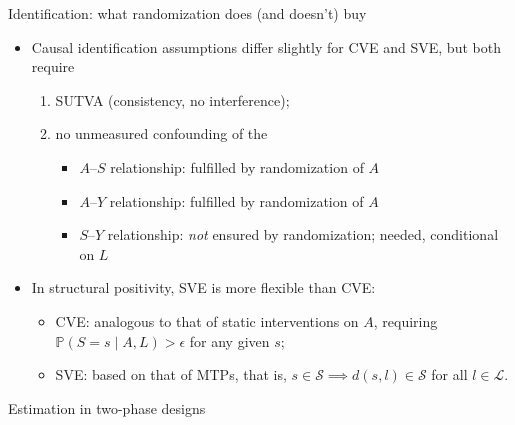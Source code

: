 \documentclass{beamer}
\begin{document}
\begin{frame}[c]{Identification: what randomization does (and doesn't) buy}

\begin{itemize}
  \itemsep6pt
  \item Causal identification assumptions differ slightly for CVE and SVE, but
    both require
    \begin{enumerate}
      \itemsep2pt
      \item SUTVA (consistency, no interference);
      \item no unmeasured confounding of the
        \begin{itemize}
          \itemsep0pt
          \item $A$--$S$ relationship: fulfilled by randomization of $A$
            \checkmark
          \item $A$--$Y$ relationship: fulfilled by randomization of $A$
            \checkmark
          \item \alert{$S$--$Y$ relationship: \textit{not} ensured by
            randomization; needed, conditional on $L$}
        \end{itemize}
    \end{enumerate}
  \item In structural positivity, SVE is more flexible than CVE:
    \begin{itemize}
      \itemsep0pt
      \item CVE: analogous to that of static interventions on $A$, requiring
        $\mathbb{P}(S = s \mid A, L) > \epsilon$ for any given $s$;
      \item SVE: based on that of MTPs, that is, $s \in \mathcal{S} \implies
        d(s, l) \in \mathcal{S}$ for all $l \in \mathcal{L}$.
    \end{itemize}
\end{itemize}


\end{frame}


\begin{frame}[standout]
  Estimation in two-phase designs
\end{frame}
\end{document}
